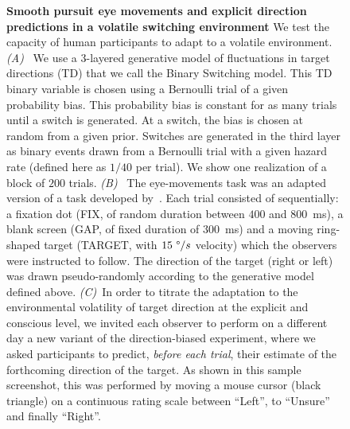 \documentclass[10pt,letterpaper]{article}
\newcommand{\ms}{\si{\milli\second}}%
\newcommand{\citet}[1]{\cite{#1}}
\begin{document}
\begin{figure}%
\caption{
\textbf{Smooth pursuit eye movements and explicit direction predictions in a volatile switching environment}
We test the capacity of human participants to adapt to a volatile environment.
\textit{(A)}~
We use a 3-layered generative model of fluctuations in target directions (TD)
that we call the Binary Switching model.
This TD binary variable is chosen using a Bernoulli trial of a given probability bias.
This probability bias is constant for as many trials until a switch is generated.
At a switch, the bias is chosen at random from a given prior.
Switches are generated in the third layer as binary events drawn from a Bernoulli trial
with a given hazard rate (defined here as $1/40$ per trial). We show one realization of a block of $200$ trials.
\textit{(B)}~
The eye-movements task was an adapted version of a task developed by~\citet{Montagnini2010}.
Each trial consisted of sequentially:
a fixation dot (FIX, of random duration between $400$ and $800$~\ms),
a blank screen (GAP, of fixed duration of  $300$~\ms) and
a moving ring-shaped target (TARGET, with $15~\degree/s$ velocity) which the observers were instructed to follow.
The direction of the target (right or left) was drawn pseudo-randomly
according to the generative model defined above.
\textit{(C)}~In order to titrate the adaptation
to the environmental volatility of target direction at the explicit and conscious level,
we invited each observer to perform on a different day a new variant of the direction-biased experiment,
where we asked participants to predict, \emph{before each trial}, %
their estimate of the forthcoming direction of the target.
As shown in this sample screenshot,
this was performed by moving a mouse cursor (black triangle) on a continuous rating scale
between ``Left'', to ``Unsure'' and finally ``Right''.
}
\label{fig:intro}
\end{figure}
\end{document}
